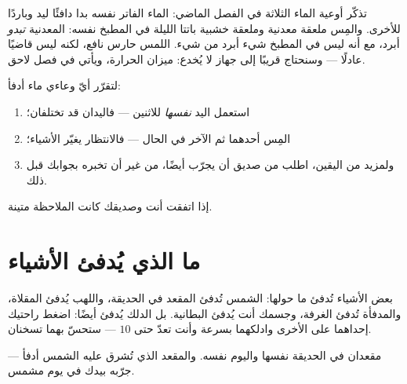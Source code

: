 \begin{remark}\label{rem:g1:hot-and-cold:fooled}
تذكّر أوعية الماء الثلاثة في الفصل الماضي: الماء الفاتر نفسه بدا
دافئًا ليد وباردًا للأخرى. والمِس ملعقة معدنية وملعقة خشبية باتتا
الليلة في المطبخ نفسه: المعدنية \emph{تبدو} أبرد، مع أنه ليس في
المطبخ شيء أبرد من شيء. اللمس حارس نافع، لكنه ليس قاضيًا عادلًا
--- وسنحتاج قريبًا إلى جهاز لا يُخدع: ميزان الحرارة، ويأتي في فصل
لاحق.
\end{remark}

\begin{method}\label{met:g1:hot-and-cold:compare}
لتقرّر أيّ وعاءي ماء أدفأ:
\begin{enumerate}
  \item استعمل اليد \emph{نفسها} للاثنين --- فاليدان قد تختلفان؛
  \item المِس أحدهما ثم الآخر في الحال --- فالانتظار يغيّر
        الأشياء؛
  \item ولمزيد من اليقين، اطلب من صديق أن يجرّب أيضًا، من غير أن
        تخبره بجوابك قبل ذلك.
\end{enumerate}
إذا اتفقت أنت وصديقك كانت الملاحظة متينة.
\end{method}

\section{ما الذي يُدفئ الأشياء}

\begin{example}\label{ex:g1:hot-and-cold:warmers}
بعض الأشياء تُدفئ ما حولها: الشمس تُدفئ المقعد في الحديقة، واللهب
يُدفئ المقلاة، والمدفأة تُدفئ الغرفة، وجسمك أنت يُدفئ البطانية. بل
الدلك يُدفئ أيضًا: اضغط راحتيك إحداهما على الأخرى وادلكهما بسرعة
وأنت تعدّ حتى $10$ --- ستحسّ بهما تسخنان.
\end{example}

\begin{omfigure}

{\small مقعدان في الحديقة نفسها واليوم نفسه. والمقعد الذي تُشرق
عليه الشمس أدفأ --- جرّبه بيدك في يوم مشمس.}
\end{omfigure}

